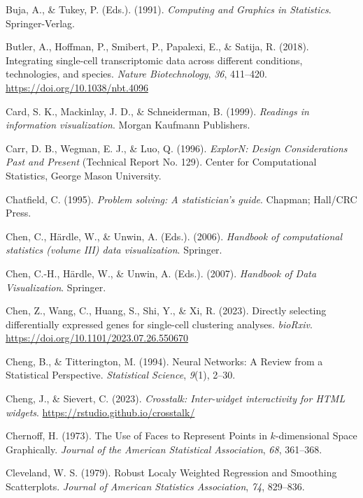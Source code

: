 \documentclass[
  letterpaper,
]{krantz}
\newlength{\cslhangindent}
\newenvironment{CSLReferences}[2] %
 {\begin{list}{}{%
  \setlength{\itemindent}{0pt}
  \setlength{\leftmargin}{0pt}
  \setlength{\parsep}{0pt}
  \ifodd #1
   \setlength{\leftmargin}{\cslhangindent}
   \setlength{\itemindent}{-1\cslhangindent}
  \fi
  \setlength{\itemsep}{#2\baselineskip}}}
 {\end{list}}
\begin{document}
\begin{CSLReferences}{1}{0}
Buja, A., \& Tukey, P. (Eds.). (1991). \emph{Computing and {G}raphics in
{S}tatistics}. Springer-Verlag.

Butler, A., Hoffman, P., Smibert, P., Papalexi, E., \& Satija, R.
(2018). Integrating single-cell transcriptomic data across different
conditions, technologies, and species. \emph{Nature Biotechnology},
\emph{36}, 411--420. \url{https://doi.org/10.1038/nbt.4096}

Card, S. K., Mackinlay, J. D., \& Schneiderman, B. (1999).
\emph{Readings in information visualization}. Morgan Kaufmann
Publishers.

Carr, D. B., Wegman, E. J., \& Luo, Q. (1996). \emph{Explor{N}: {D}esign
{C}onsiderations {P}ast and {P}resent} (Technical Report No. 129).
Center for Computational Statistics, George Mason University.

Chatfield, C. (1995). \emph{Problem solving: A statistician's guide}.
Chapman; Hall/CRC Press.

Chen, C., Härdle, W., \& Unwin, A. (Eds.). (2006). \emph{Handbook of
computational statistics (volume III) data visualization}. Springer.

Chen, C.-H., Härdle, W., \& Unwin, A. (Eds.). (2007). \emph{Handbook of
{D}ata {V}isualization}. Springer.

Chen, Z., Wang, C., Huang, S., Shi, Y., \& Xi, R. (2023). Directly
selecting differentially expressed genes for single-cell clustering
analyses. \emph{bioRxiv}.
\url{https://doi.org/10.1101/2023.07.26.550670}

Cheng, B., \& Titterington, M. (1994). Neural {N}etworks: {A} {R}eview
from a {S}tatistical {P}erspective. \emph{Statistical Science},
\emph{9}(1), 2--30.

Cheng, J., \& Sievert, C. (2023). \emph{Crosstalk: Inter-widget
interactivity for HTML widgets}.
\url{https://rstudio.github.io/crosstalk/}

Chernoff, H. (1973). The {U}se of {F}aces to {R}epresent {P}oints in
\(k\)-dimensional {S}pace {G}raphically. \emph{Journal of the American
Statistical Association}, \emph{68}, 361--368.

Cleveland, W. S. (1979). Robust {L}ocaly {W}eighted {R}egression and
{S}moothing {S}catterplots. \emph{Journal of American Statistics
Association}, \emph{74}, 829--836.


\end{CSLReferences}
\end{document}
